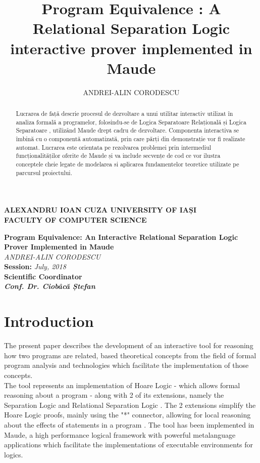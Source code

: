 \documentclass[12pt,a4paper]{article}
\author{ANDREI-ALIN CORODESCU}
\title{Program Equivalence : A Relational Separation Logic interactive prover implemented in Maude}
\newcommand\blankpage{%
	\null
	\thispagestyle{empty}%
	\addtocounter{page}{-1}%
	\newpage}
\begin{document}
\begin{titlepage}
\begin{center}
\afterpage{\blankpage}
\textbf{
ALEXANDRU IOAN CUZA UNIVERSITY OF IAȘI
}
\\
\textbf{FACULTY OF COMPUTER SCIENCE}
\end{center}
   \vspace{40mm}
\begin{center}
	\Large\textbf {Program Equivalence: An Interactive Relational Separation Logic Prover Implemented in Maude}\\
	\vspace{40mm}
	\large\textit {ANDREI-ALIN CORODESCU}
	\\
	\vspace{20mm}
	\textbf{Session: }\textit{July, 2018}\\
	\vspace{30mm}
	\textbf{Scientific Coordinator}\\
	\textbf{\textit{Conf. Dr. Ciobâcă Ștefan}}
	\vspace{30mm}
\end{center}
\end{titlepage}

\tableofcontents
\pagebreak
\begin{abstract}
	Lucrarea de față descrie procesul de dezvoltare a unui utilitar interactiv utilizat în analiza formală a programelor, folosindu-se de Logica Separatoare Relațională \cite{relational} și Logica Separatoare \cite{primer} \cite{SeparationLogic}, utilizând Maude \cite{maudesite} drept cadru de dezvoltare. Componenta interactiva se îmbină cu o componentă automatizată, prin care părți din demonstrație vor fi realizate automat. Lucrarea este orientata pe rezolvarea problemei prin intermediul funcționalităților oferite de Maude și va include secvențe de cod ce vor ilustra conceptele cheie legate de modelarea si aplicarea fundamentelor teoretice utilizate pe parcursul proiectului.
\end{abstract}
\section*{Introduction}
The present paper describes the development of an interactive tool for reasoning how two programs are related, based theoretical concepts from the field of formal program analysis and technologies which facilitate the implementation of those concepts. \\

The tool represents an implementation of Hoare Logic - which allows formal reasoning about a program - along  with 2 of its extensions, namely the Separation Logic and Relational Separation Logic \cite{relational}. The 2 extensions simplify the Hoare Logic proofs, mainly using the "*" connector, allowing for local reasoning about the effects of statements in a program . The tool has been implemented in Maude, a high performance logical framework with powerful metalanguage applications which facilitate the implementations of executable environments for logics.\\
\end{document}
